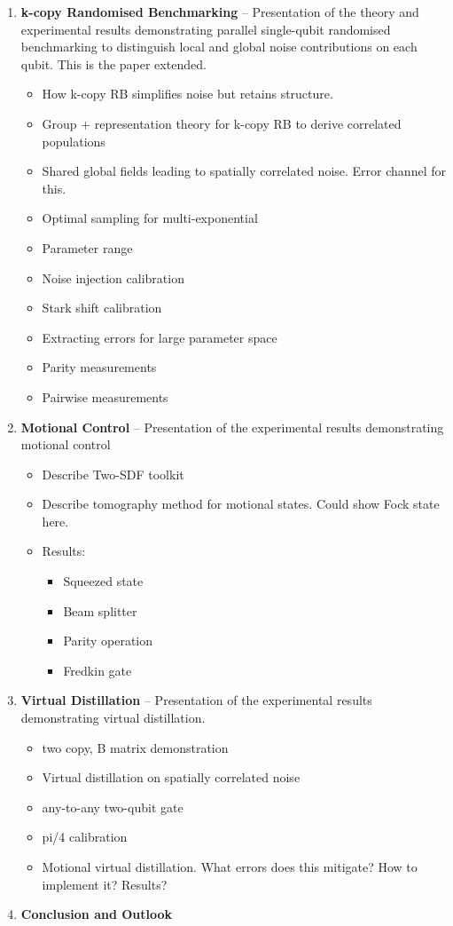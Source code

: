 \begin{enumerate}
    \item \textbf{k-copy Randomised Benchmarking} 
    -- Presentation of the theory and experimental results demonstrating
    parallel single-qubit randomised benchmarking to distinguish local and
    global noise contributions on each qubit. This is the paper extended.
    \begin{itemize}
        \item How k-copy RB simplifies noise but retains structure.
        \item Group + representation theory for k-copy RB to derive correlated populations
        \item Shared global fields leading to spatially correlated noise. Error channel for this.
        \item Optimal sampling for multi-exponential
        \item Parameter range
        \item Noise injection calibration
        \item Stark shift calibration
        \item Extracting errors for large parameter space
        \item Parity measurements
        \item Pairwise measurements
    \end{itemize}

    \item \textbf{Motional Control}
    -- Presentation of the experimental results demonstrating motional control
    \begin{itemize}
        \item Describe Two-SDF toolkit
        \item Describe tomography method for motional states. Could show Fock state here.
        \item Results:
            \begin{itemize}
                \item Squeezed state
                \item Beam splitter
                \item Parity operation
                \item Fredkin gate
            \end{itemize}
    \end{itemize}

    \item \textbf{Virtual Distillation}
    -- Presentation of the experimental results demonstrating virtual distillation.
    \begin{itemize}
        \item two copy, B matrix demonstration
        \item Virtual distillation on spatially correlated noise
        \item any-to-any two-qubit gate
        \item pi/4 calibration
        \item Motional virtual distillation. What errors does this mitigate? How to implement it? Results?
    \end{itemize}

    \item \textbf{Conclusion and Outlook} 

\end{enumerate}